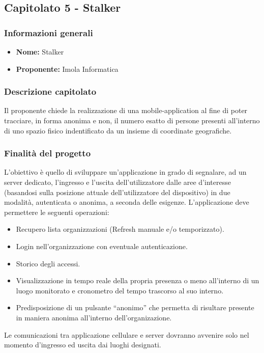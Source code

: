 \subsection{Capitolato 5 - Stalker}

	\subsubsection{Informazioni generali}
		\begin{itemize}
			\item \textbf{Nome:} Stalker
			\item \textbf{Proponente:} Imola Informatica
		\end{itemize}
	
	\subsubsection{Descrizione capitolato}
		Il proponente chiede la realizzazione di una mobile-application al fine di poter tracciare, in forma anonima e non, il numero esatto di persone presenti all'interno di uno spazio fisico indentificato da un insieme di coordinate geografiche.
		
	\subsubsection{Finalità del progetto}
		L’obiettivo è quello di sviluppare un’applicazione in grado di segnalare, ad un server dedicato, l’ingresso e l’uscita dell’utilizzatore dalle aree d’interesse (basandosi sulla posizione attuale dell'utilizzatore del dispositivo) in due modalità, autenticata o anonima, a seconda delle esigenze.
		L’applicazione deve permettere le seguenti operazioni: 
		\begin{itemize}
			\item Recupero lista organizzazioni (Refresh manuale e/o temporizzato).
			\item Login nell’organizzazione con eventuale autenticazione.
			\item Storico degli accessi.
			\item Visualizzazione in tempo reale della propria presenza o meno all’interno di un luogo monitorato e cronometro del tempo trascorso al suo interno.
			\item Predisposizione di un pulsante “anonimo” che permetta di risultare presente in maniera anonima all'interno dell'organizazione.
		\end{itemize}
		Le comunicazioni tra applicazione cellulare e server dovranno avvenire solo nel momento d'ingresso ed uscita dai luoghi designati.
	
